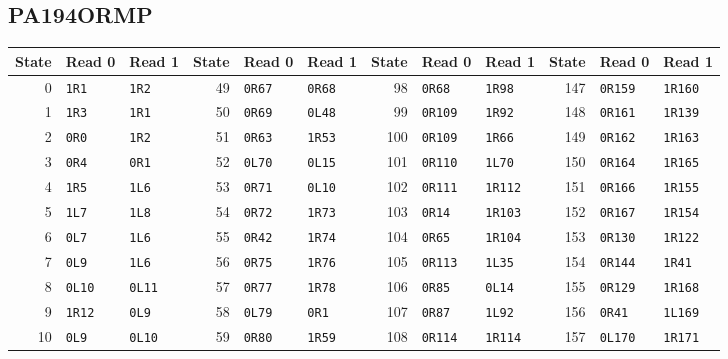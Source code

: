 \subsection{PA194ORMP}
\begin{center}
\begingroup\fontsize{8.5}{10}\selectfont\setlength{\tabcolsep}{3.3pt}\renewcommand{\arraystretch}{1.03}
\begin{tabular}{rll@{\qquad}rll@{\qquad}rll@{\qquad}rll}
\toprule
State & Read 0 & Read 1 & State & Read 0 & Read 1 & State & Read 0 & Read 1 & State & Read 0 & Read 1\\
\midrule
0 & \texttt{1R1} & \texttt{1R2} & 49 & \texttt{0R67} & \texttt{0R68} & 98 & \texttt{0R68} & \texttt{1R98} & 147 & \texttt{0R159} & \texttt{1R160}\\
1 & \texttt{1R3} & \texttt{1R1} & 50 & \texttt{0R69} & \texttt{0L48} & 99 & \texttt{0R109} & \texttt{1R92} & 148 & \texttt{0R161} & \texttt{1R139}\\
2 & \texttt{0R0} & \texttt{1R2} & 51 & \texttt{0R63} & \texttt{1R53} & 100 & \texttt{0R109} & \texttt{1R66} & 149 & \texttt{0R162} & \texttt{1R163}\\
3 & \texttt{0R4} & \texttt{0R1} & 52 & \texttt{0L70} & \texttt{0L15} & 101 & \texttt{0R110} & \texttt{1L70} & 150 & \texttt{0R164} & \texttt{1R165}\\
4 & \texttt{1R5} & \texttt{1L6} & 53 & \texttt{0R71} & \texttt{0L10} & 102 & \texttt{0R111} & \texttt{1R112} & 151 & \texttt{0R166} & \texttt{1R155}\\
5 & \texttt{1L7} & \texttt{1L8} & 54 & \texttt{0R72} & \texttt{1R73} & 103 & \texttt{0R14} & \texttt{1R103} & 152 & \texttt{0R167} & \texttt{1R154}\\
6 & \texttt{0L7} & \texttt{1L6} & 55 & \texttt{0R42} & \texttt{1R74} & 104 & \texttt{0R65} & \texttt{1R104} & 153 & \texttt{0R130} & \texttt{1R122}\\
7 & \texttt{0L9} & \texttt{1L6} & 56 & \texttt{0R75} & \texttt{1R76} & 105 & \texttt{0R113} & \texttt{1L35} & 154 & \texttt{0R144} & \texttt{1R41}\\
8 & \texttt{0L10} & \texttt{0L11} & 57 & \texttt{0R77} & \texttt{1R78} & 106 & \texttt{0R85} & \texttt{0L14} & 155 & \texttt{0R129} & \texttt{1R168}\\
9 & \texttt{1R12} & \texttt{0L9} & 58 & \texttt{0L79} & \texttt{0R1} & 107 & \texttt{0R87} & \texttt{1L92} & 156 & \texttt{0R41} & \texttt{1L169}\\
10 & \texttt{0L9} & \texttt{0L10} & 59 & \texttt{0R80} & \texttt{1R59} & 108 & \texttt{0R114} & \texttt{1R114} & 157 & \texttt{0L170} & \texttt{1R171}\\

\end{tabular}
\end{center}
